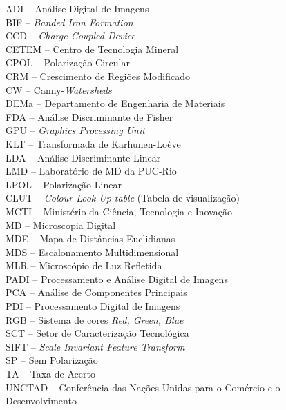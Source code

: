\noindent \doublespacing
ADI -- Análise Digital de Imagens\\
BIF -- \textit{Banded Iron Formation}\\ 	
CCD -- \textit{Charge-Coupled Device}\\
CETEM -- Centro de Tecnologia Mineral\\
CPOL -- Polarização Circular\\
CRM -- Crescimento de Regiões Modificado \\
CW -- Canny-\textit{Watersheds} \\
DEMa -- Departamento de Engenharia de Materiais\\
FDA -- Análise Discriminante de Fisher\\
GPU -- \textit{Graphics Processing Unit}\\ 	
KLT -- Transformada de Karhunen-Loève\\
LDA -- Análise Discriminante Linear\\
LMD -- Laboratório de MD da PUC-Rio\\
LPOL -- Polarização Linear\\
CLUT -- \textit{Colour Look-Up table} (Tabela de visualização)\\
MCTI -- Ministério da Ciência, Tecnologia e Inovação\\
MD -- Microscopia Digital\\
MDE -- Mapa de Distâncias Euclidianas\\	
MDS -- Escalonamento Multidimensional\\
MLR -- Microscópio de Luz Refletida\\
PADI -- Processamento e Análise Digital de Imagens\\
PCA -- Análise de Componentes Principais\\
PDI -- Processamento Digital de Imagens\\
RGB -- Sistema de cores \textit{Red, Green, Blue}\\
SCT -- Setor de Caracterização Tecnológica\\
SIFT -- \textit{Scale Invariant Feature Transform}\\
SP -- Sem Polarização\\
TA -- Taxa de Acerto\\
UNCTAD -- Conferência das Nações Unidas para o Comércio e o Desenvolvimento\\
